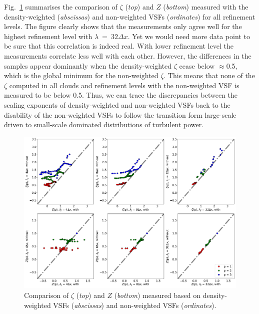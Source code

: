 Fig.~\ref{pic:results:comp_weighting} summarises the comparison of $\zeta$ (\textit{top}) and $Z$ (\textit{bottom}) measured with the density-weighted (\textit{abscissas}) and non-weighted VSFs (\textit{ordinates}) for all refinement levels.
The figure clearly shows that the measurements only agree well for the highest refinement level with $\lambda~=~32\Delta x$.
Yet we would need more data point to be sure that this correlation is indeed real.
With lower refinement level the measurements correlate less well with each other. 
However, the differences in the samples appear dominantly when the density-weighted $\zeta$ cease below $\approx$0.5, which is the global minimum for the non-weighted $\zeta$. 
This means that none of the $\zeta$ computed in all clouds and refinement levels with the non-weighted VSF is measured to be below 0.5.
Thus, we can trace the discrepancies between the scaling exponents of density-weighted and non-weighted VSFs back to the disability of the non-weighted VSFs to follow the transition form large-scale driven to small-scale dominated distributions of turbulent power. 

\begin{figure}
	\centering
    \includegraphics[width=\textwidth]{comp_weighting.pdf}
    \caption{ Comparison of $\zeta$ (\textit{top}) and $Z$ (\textit{bottom}) measured based on density-weighted VSFs (\textit{abscissas}) and non-weighted VSFs (\textit{ordinates}). }
    \label{pic:results:comp_weighting}
\end{figure}
